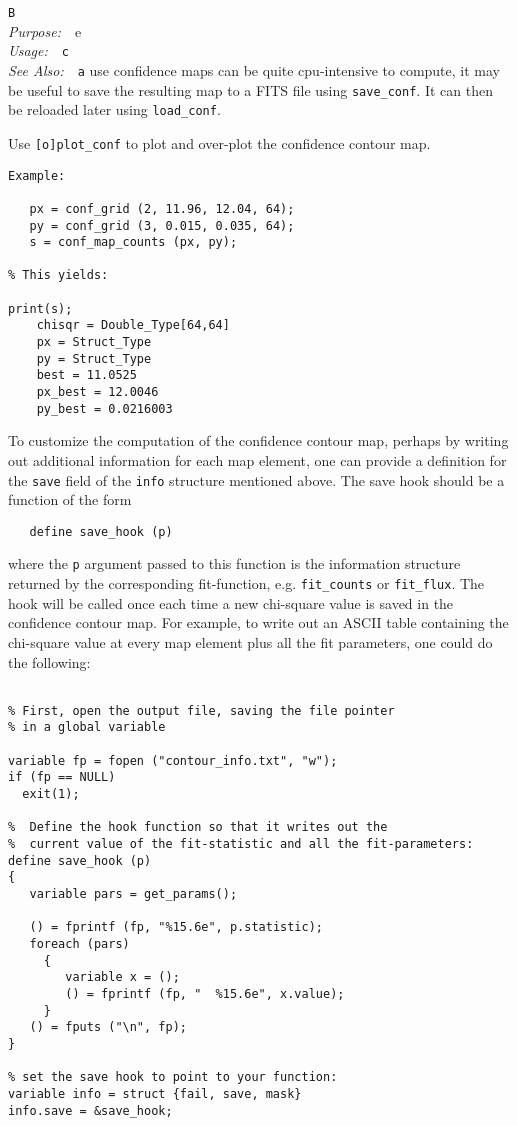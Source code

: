 \documentclass{book}
\makeatletter
\newif\ifpdf
\newenvironment{isisfunction}[4]%
{\index{{#1}@{\tt #1}}%
  \ifpdf
  \else
     \addcontentsline{toc}{subsection}{{#1} -- {#2}}
  \fi
  \vbox{
          \vspace*{\baselineskip}
          {\LARGE\tt #1}\vspace*{\baselineskip}\\
          {{\it Purpose:}~~{#2}}\\
          {{\it Usage:}~~{\tt #3}}\\
          {{\it See Also:}~~{\tt #4}}
       }
}%
{ }
\makeatother
\begin{document}
{\begin{isisfunction}
Because confidence maps can be quite cpu-intensive to compute, it
may be useful to save the resulting map to a FITS file using
\verb|save_conf|.  It can then be reloaded later using
\verb|load_conf|.

Use \verb|[o]plot_conf| to plot and over-plot the confidence
contour map.

\begin{verbatim}
Example:

   px = conf_grid (2, 11.96, 12.04, 64);
   py = conf_grid (3, 0.015, 0.035, 64);
   s = conf_map_counts (px, py);

% This yields:

print(s);
    chisqr = Double_Type[64,64]
    px = Struct_Type
    py = Struct_Type
    best = 11.0525
    px_best = 12.0046
    py_best = 0.0216003
\end{verbatim}

To customize the computation of the confidence contour map,
perhaps by writing out additional information for each map
element, one can provide a definition for the \verb|save|
field of the \verb|info| structure mentioned above.
The save hook should be a function of the form
\begin{verbatim}
   define save_hook (p)
\end{verbatim}
where the \verb|p| argument passed to this function is the
information structure returned by the corresponding fit-function,
e.g. \verb|fit_counts| or \verb|fit_flux|. The hook will be called
once each time a new chi-square value is saved in the confidence
contour map. For example, to write out an ASCII table containing
the chi-square value at every map element plus all the fit
parameters, one could do the following:
\begin{verbatim}

% First, open the output file, saving the file pointer
% in a global variable

variable fp = fopen ("contour_info.txt", "w");
if (fp == NULL)
  exit(1);

%  Define the hook function so that it writes out the
%  current value of the fit-statistic and all the fit-parameters:
define save_hook (p)
{
   variable pars = get_params();

   () = fprintf (fp, "%15.6e", p.statistic);
   foreach (pars)
     {
        variable x = ();
        () = fprintf (fp, "  %15.6e", x.value);
     }
   () = fputs ("\n", fp);
}

% set the save hook to point to your function:
variable info = struct {fail, save, mask}
info.save = &save_hook;


\end{verbatim}
\end{isisfunction}}
\end{document}
